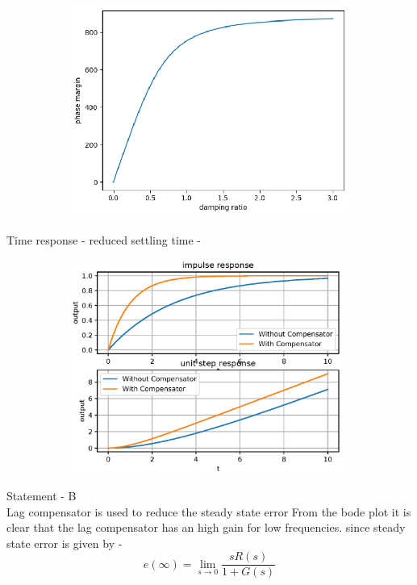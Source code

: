 \begin{enumerate}[label=\thesection.\arabic*.,ref=\thesection.\theenumi]
\begin{figure}[h]
\begin{subfigure}{\textwidth}
\includegraphics[width=1\linewidth, height=7cm ,inner]{./figs/ee18btech11027/realtion.eps} 
\label{fig:subim1}
\end{subfigure}
\end{figure}

    



Time response - reduced settling time - 
\begin{figure}[h]
 
\begin{subfigure}{\textwidth}
\includegraphics[width=1\linewidth, height=7cm ,inner]{./figs/ee18btech11027/settling_time.eps} 
\label{fig:subim1}
\end{subfigure}
\end{figure}

    
Statement - B\\Lag compensator is used to reduce the steady state error
From the bode plot it is clear that the lag compensator has an high gain for low frequencies.
since steady state error is given by - 
\begin{equation}
    e(\infty) = \lim_{s\to0} \frac{sR(s)}{1+G(s)}
\end{equation}
\begin{figure}[h]
 

\end{figure}
\end{enumerate}
